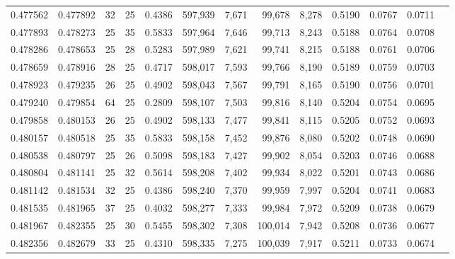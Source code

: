 \begin{tabular}{rrrrrrrrrrrrr}
0.477562 & 0.477892 &    32 &  25 &                                     0.4386 & 597,939 &   7,671 &  99,678 &   8,278 & 0.5190 & 0.0767 & 0.0711 \\
0.477893 & 0.478273 &    25 &  35 &                                     0.5833 & 597,964 &   7,646 &  99,713 &   8,243 & 0.5188 & 0.0764 & 0.0708 \\
0.478286 & 0.478653 &    25 &  28 &                                     0.5283 & 597,989 &   7,621 &  99,741 &   8,215 & 0.5188 & 0.0761 & 0.0706 \\
0.478659 & 0.478916 &    28 &  25 &                                     0.4717 & 598,017 &   7,593 &  99,766 &   8,190 & 0.5189 & 0.0759 & 0.0703 \\
0.478923 & 0.479235 &    26 &  25 &                                     0.4902 & 598,043 &   7,567 &  99,791 &   8,165 & 0.5190 & 0.0756 & 0.0701 \\
0.479240 & 0.479854 &    64 &  25 &                                     0.2809 & 598,107 &   7,503 &  99,816 &   8,140 & 0.5204 & 0.0754 & 0.0695 \\
0.479858 & 0.480153 &    26 &  25 &                                     0.4902 & 598,133 &   7,477 &  99,841 &   8,115 & 0.5205 & 0.0752 & 0.0693 \\
0.480157 & 0.480518 &    25 &  35 &                                     0.5833 & 598,158 &   7,452 &  99,876 &   8,080 & 0.5202 & 0.0748 & 0.0690 \\
0.480538 & 0.480797 &    25 &  26 &                                     0.5098 & 598,183 &   7,427 &  99,902 &   8,054 & 0.5203 & 0.0746 & 0.0688 \\
0.480804 & 0.481141 &    25 &  32 &                                     0.5614 & 598,208 &   7,402 &  99,934 &   8,022 & 0.5201 & 0.0743 & 0.0686 \\
0.481142 & 0.481534 &    32 &  25 &                                     0.4386 & 598,240 &   7,370 &  99,959 &   7,997 & 0.5204 & 0.0741 & 0.0683 \\
0.481535 & 0.481965 &    37 &  25 &                                     0.4032 & 598,277 &   7,333 &  99,984 &   7,972 & 0.5209 & 0.0738 & 0.0679 \\
0.481967 & 0.482355 &    25 &  30 &                                     0.5455 & 598,302 &   7,308 & 100,014 &   7,942 & 0.5208 & 0.0736 & 0.0677 \\
0.482356 & 0.482679 &    33 &  25 &                                     0.4310 & 598,335 &   7,275 & 100,039 &   7,917 & 0.5211 & 0.0733 & 0.0674 \\

\end{tabular}
